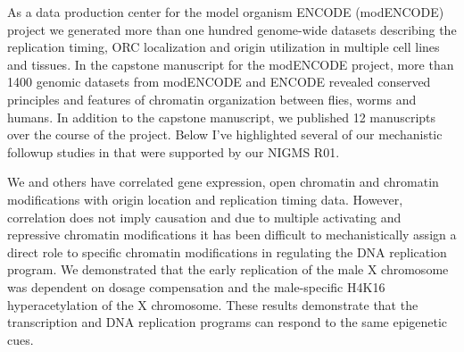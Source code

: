 As a data production center for the model organism ENCODE (modENCODE) project we generated more than one hundred genome-wide datasets describing the replication timing, ORC localization and origin utilization in multiple \dros cell lines and tissues\citep{Mod_Encode_Consortium2010-io}.  In the capstone manuscript for the modENCODE project, more than 1400 genomic datasets from modENCODE and ENCODE revealed conserved principles and features of chromatin organization between flies, worms and humans\citep{Ho2014-xa}. %
In addition to the capstone manuscript, we published 12 manuscripts over the course of the project. Below I've highlighted several of our mechanistic followup studies in \dros that were supported by our NIGMS R01.

We and others have correlated gene expression, open chromatin and chromatin modifications with origin location and replication timing data.  However, correlation does not  imply causation and due to multiple activating and repressive chromatin modifications it has been difficult to mechanistically assign a direct role to specific chromatin modifications in regulating the DNA replication program. We  demonstrated that the early replication of the \dros male X chromosome was dependent on dosage compensation and the male-specific H4K16 hyperacetylation of the X chromosome\citep{Lubelsky2014-zn}.  These results demonstrate that the transcription and DNA replication programs can respond to the same epigenetic cues.




